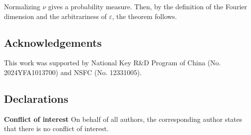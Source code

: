 \documentclass[12pt,a4paper,twoside]{article}
\begin{document}
Normalizing \(\nu\) gives a probability measure. Then, by the definition of the Fourier dimension and the arbitrariness of \(\varepsilon\), the theorem follows.


\subsection*{Acknowledgements}
This work was supported by National Key R$\&$D Program of China (No. 2024YFA1013700) and NSFC (No. 12331005).



\subsection*{Declarations}

{\bf Conflict of interest} On behalf of all authors, the corresponding author states that there is no conflict of interest.
\end{document}
